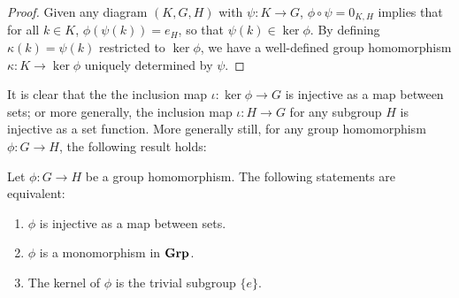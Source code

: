 \begin{proof}
    Given any diagram \((K, G, H)\) with \(\psi: K \to G\), \(\phi \circ \psi =
    0_{K,H}\) implies that for all \(k \in K\), \(\phi(\psi(k)) = e_H\), so that
    \(\psi(k) \in \ker \phi\). By defining \(\kappa(k) = \psi(k)\) restricted to
    \(\ker \phi\), we have a well-defined group homomorphism \(\kappa: K \to
    \ker \phi\) uniquely determined by \(\psi\).
\end{proof}


It is clear that the the inclusion map \(\iota: \ker \phi \to G\) is injective
as a map between sets; or more generally, the inclusion map \(\iota: H \to G\)
for any subgroup \(H\) is injective as a set function. More generally still, for
any group homomorphism \(\phi: G \to H\), the following result holds:

\begin{theorem}
    Let \(\phi: G \to H\) be a group homomorphism. The following statements are
    equivalent:
    \begin{enumerate}[label=(\alph*)]
        \item \(\phi\) is injective as a map between sets.
        \item \(\phi\) is a monomorphism in \(\mathbf{Grp}\).
        \item The kernel of \(\phi\) is the trivial subgroup \(\{e\}\).
    \end{enumerate}
\end{theorem}

